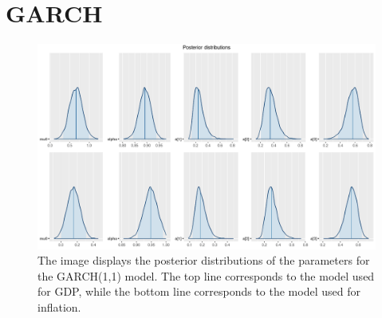 \chapter{GARCH}
\label{GARCH}

\begin{figure}[h]
    \centering
    \includegraphics[width=\textwidth]{../Images/5-GARCH/posteriors.png}
    \caption{The image displays the posterior distributions of the parameters for the GARCH(1,1) model. The top line corresponds to the model used for GDP, while the bottom line corresponds to the model used for inflation.}
    \label{fig:GARCH_posteriors}
\end{figure}

